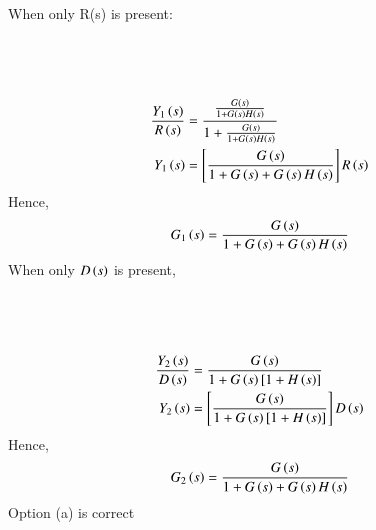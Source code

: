 \documentclass[journal,12pt,onecolumn]{IEEEtran}
\theoremstyle{remark}
\begin{document}
When only R(s) is present:\\
\begin{figure}[ht!]
\centering

\end{figure}\\
\begin{figure}[ht!]
\centering

\end{figure}\\
\begin{align}
\frac{Y_1\left(s\right)}{R\left(s\right)} &= \frac{\frac{G\left(s\right)}{1+ G\left(s\right)H\left(s\right)}}{1+ \frac{G\left(s\right)}{1+G\left(s\right)H\left(s\right)}}\\
Y_1\left(s\right) &= \left[\frac{G\left(s\right)}{1+ G\left(s\right)+ G\left(s\right)H\left(s\right)}\right] R\left(s\right)
\end{align}
Hence,
\begin{align}
 G_1\left(s\right) = \frac{G\left(s\right)}{1+G\left(s\right)+G\left(s\right)H\left(s\right)}
\end{align}
When only $D\left(s\right)$ is present,
\begin{figure}[ht!]
\centering

\end{figure}\\
\begin{figure}[ht!]
\centering

\end{figure}\\
\begin{align}
\frac{Y_2\left(s\right)}{D\left(s\right)} &= \frac{G\left(s\right)}{1+G\left(s\right)\left[1+ H\left(s\right)\right]}\\
Y_2\left(s\right)&= \left[ \frac{G\left(s\right)}{1+G\left(s\right)\left[1+H\left(s\right)\right]}\right]D\left(s\right)
\end{align}
Hence, 
\begin{align}
G_2\left(s\right) = \frac{G\left(s\right)}{1+ G\left(s\right)+ G\left(s\right)H\left(s\right)}
\end{align}
Option (a) is correct
\end{document}
